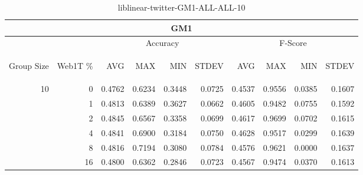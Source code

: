 \begin{center}
\begin{table}[htbp]
\begin{tabular}{ | r | r | r | r | r | r | r | r | r | r |}
\hline
\multicolumn{10}{|c|}{GM1}\\
\hline
 & & \multicolumn{4}{|c|}{Accuracy} & \multicolumn{4}{|c|}{F-Score}\\ \cline{3-10}
\begin{sideways}Group Size\end{sideways} & \begin{sideways}Web1T \%\end{sideways} & \begin{sideways}AVG\end{sideways} & \begin{sideways}MAX\end{sideways} & \begin{sideways}MIN\end{sideways} & \begin{sideways}STDEV\end{sideways} & \begin{sideways}AVG\end{sideways} & \begin{sideways}MAX\end{sideways} & \begin{sideways}MIN\end{sideways} & \begin{sideways}STDEV\end{sideways}\\
\hline
\multirow{5}{*}{10}
 & 0 & 0.4762 & 0.6234 & 0.3448 & 0.0725 & 0.4537 & 0.9556 & 0.0385 & 0.1607\\ \cline{2-10}
 & 1 & 0.4813 & 0.6389 & 0.3627 & 0.0662 & 0.4605 & 0.9482 & 0.0755 & 0.1592\\ \cline{2-10}
 & 2 & 0.4845 & 0.6567 & 0.3358 & 0.0699 & 0.4617 & 0.9699 & 0.0702 & 0.1615\\ \cline{2-10}
 & 4 & 0.4841 & 0.6900 & 0.3184 & 0.0750 & 0.4628 & 0.9517 & 0.0299 & 0.1639\\ \cline{2-10}
 & 8 & 0.4816 & 0.7194 & 0.3080 & 0.0784 & 0.4576 & 0.9621 & 0.0000 & 0.1637\\ \cline{2-10}
 & 16 & 0.4800 & 0.6362 & 0.2846 & 0.0723 & 0.4567 & 0.9474 & 0.0370 & 0.1613\\ \cline{2-10}
\hline
\end{tabular}
\caption{liblinear-twitter-GM1-ALL-ALL-10}
\label{table:liblinear-twitter-GM1-ALL-ALL-10}
\end{table}
\end{center}

